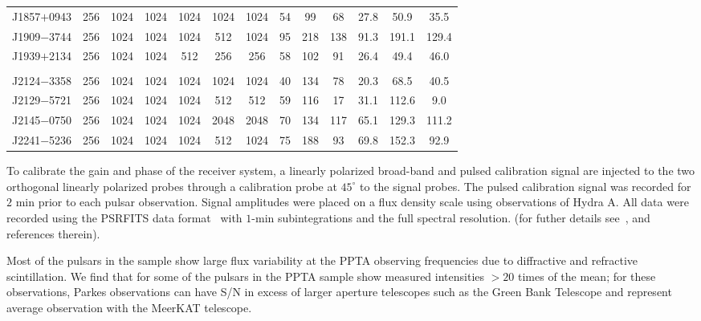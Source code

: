 \documentclass[useAMS,usenatbib]{mn2e}
\begin{document}
\begin{table}
\begin{center}
\begin{tabular}{lcccccccccccc}
J1857$+$0943&  256    &    1024         &   1024   &  1024   &  1024       &  1024    &  54     &  99         & 68       &  27.8   &    50.9          &  35.5   \\ 
J1909$-$3744&  256    &    1024         &   1024   &  1024   &  512        &  1024    &  95     &  218        & 138      &  91.3   &    191.1         &  129.4   \\ 
J1939$+$2134&  256    &    1024         &   1024   &  512    &  256        &  256     &  58     &  102        & 91       &  26.4   &    49.4          &  46.0    \\ 
						&         &                 &          &         &             &          &         &             &          &         &                  &     \\
J2124$-$3358&  256    &    1024         &   1024   &  1024   &  1024       &  1024    &  40     &  134        & 78       &  20.3   &    68.5          &  40.5    \\ 
J2129$-$5721&  256    &    1024         &   1024   &  1024   &  512        &  512     &  59     &  116        & 17       &  31.1   &    112.6         &  9.0     \\ 
J2145$-$0750&  256    &    1024         &   1024   &  1024   &  2048       &  2048    &  70     &  134        & 117      &  65.1   &    129.3         &  111.2   \\ 
J2241$-$5236&  256    &    1024         &   1024   &  1024   &  512        &  1024    &  75     &  188        & 93       &  69.8   &    152.3         &  92.9   \\ 
\hline
\end{tabular}
\end{center}
\end{table}


To calibrate the gain and phase of the receiver system, a linearly polarized 
broad-band and pulsed calibration signal are injected to the two orthogonal 
linearly polarized probes through a calibration probe at $45^{\circ}$ to the 
signal probes. The pulsed calibration signal was recorded for $2$ min prior to 
each pulsar observation.
%
Signal amplitudes were placed on a flux density scale using observations of 
Hydra A.
%
All data were recorded using the PSRFITS data format~\citep{Hotan04} with 
$1$-min subintegrations and the full spectral resolution.
%
(for futher details see~\citet{Manchester13}, and references therein). 
%

Most of the pulsars in the sample show large flux variability at the PPTA 
observing frequencies due to diffractive and refractive scintillation. 
We find that for some of the pulsars in the PPTA sample show measured intensities 
$> 20$ times of the mean; for these observations, Parkes observations can have S/N 
in excess of larger aperture telescopes such as the Green Bank Telescope and 
represent average observation with the MeerKAT telescope.
%
\end{document}

